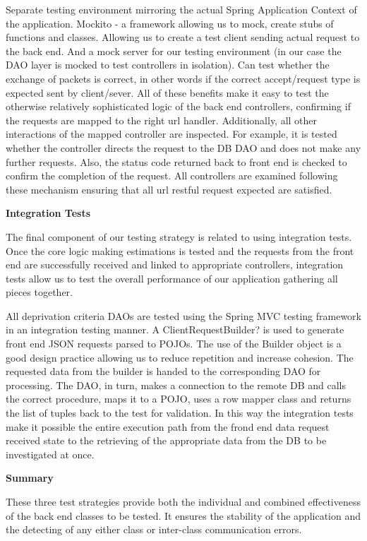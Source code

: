\documentclass{l3proj}
\begin{document}
Separate testing environment mirroring the actual Spring Application Context of the application.
Mockito - a framework allowing us to mock, create stubs of functions and classes.
Allowing us to create a test client sending actual request to the back end.
And a mock server for our testing environment (in our case the DAO layer is mocked to test controllers in isolation).
Can test whether the exchange of packets is correct, in other words if the correct accept/request type is expected sent by client/sever.
All of these benefits make it easy to test the otherwise relatively sophisticated logic of the back end controllers, confirming if the requests are mapped to the right url handler. Additionally, all other interactions of the mapped controller are inspected. For example, it is tested whether the controller directs the request to the DB DAO and does not make any further requests. Also, the status code returned back to front end is checked to confirm the completion of the request. All controllers are examined following these mechanism ensuring that all url restful request expected are satisfied.

\textbf{Integration Tests}

The final component of our testing strategy is related to using integration tests. Once the core logic making estimations is tested and the requests from the front end are successfully received and linked to appropriate controllers, integration tests allow us to test the overall performance of our application gathering all pieces together.

All deprivation criteria DAOs are tested using the Spring MVC testing framework in an integration testing manner. A ClientRequestBuilder? is used to generate front end JSON requests parsed to POJOs. The use of the Builder object is a good design practice allowing us to reduce repetition and increase cohesion. The requested data from the builder is handed to the corresponding DAO for processing. The DAO, in turn, makes a connection to the remote DB and calls the correct procedure, maps it to a POJO, uses a row mapper class and returns the list of tuples back to the test for validation. In this way the integration tests make it possible the entire execution path from the frond end data request received state to the retrieving of the appropriate data from the DB to be investigated at once.

\textbf{Summary}

These three test strategies provide both the individual and combined effectiveness of the back end classes to be tested. It ensures the stability of the application and the detecting of any either class or inter-class communication errors.
\end{document}
